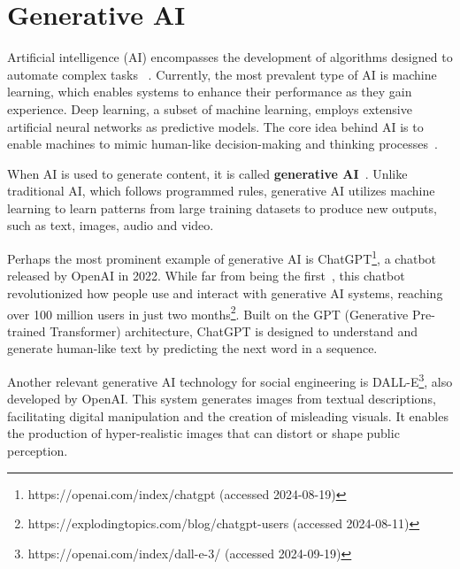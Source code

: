 \section{Generative AI}
\begin{comment}
    - 
\end{comment}

Artificial intelligence (AI) encompasses the development of algorithms designed to automate complex tasks ~\citep{mirsky_Threat_Offensive_AI_Organizations_2023}. Currently, the most prevalent type of AI is machine learning, which enables systems to enhance their performance as they gain experience. Deep learning, a subset of machine learning, employs extensive artificial neural networks as predictive models. The core idea behind AI is to enable machines to mimic human-like decision-making and thinking processes~\citep{fakhouri_AI_Driven_Solutions_SE_Attacks_2024}.

When AI is used to generate content, it is called \textbf{generative AI}~\citep{goodfellow_Generative_Adversarial_Networks_2020}. Unlike traditional AI, which follows programmed rules, generative AI utilizes machine learning to learn patterns from large training datasets to produce new outputs, such as text, images, audio and video.

Perhaps the most prominent example of generative AI is ChatGPT\footnote{https://openai.com/index/chatgpt (accessed 2024-08-19)}, a chatbot released by OpenAI in 2022. While far from being the first~\citep{weizenbaum_ELIZA_1996}, this chatbot revolutionized how people use and interact with generative AI systems, reaching over 100 million users in just two months\footnote{https://explodingtopics.com/blog/chatgpt-users (accessed 2024-08-11)}. Built on the GPT (Generative Pre-trained Transformer) architecture, ChatGPT is designed to understand and generate human-like text by predicting the next word in a sequence.

Another relevant generative AI technology for social engineering is DALL-E\footnote{https://openai.com/index/dall-e-3/ (accessed 2024-09-19)}, also developed by OpenAI. This system generates images from textual descriptions, facilitating digital manipulation and the creation of misleading visuals. It enables the production of hyper-realistic images that can distort or shape public perception.





